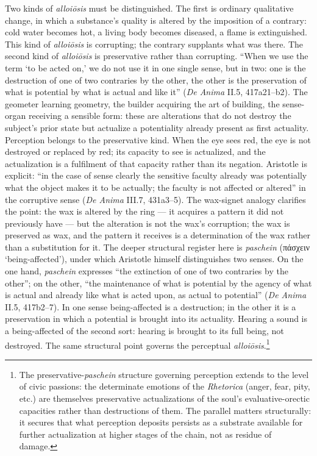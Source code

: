 \documentclass{article}
\newcommand{\gk}[1]{{\greekfont #1}}
\begin{document}
Two kinds of \textit{alloiōsis} must be distinguished. The first is ordinary qualitative change, in which a substance's quality is altered by the imposition of a contrary: cold water becomes hot, a living body becomes diseased, a flame is extinguished. This kind of \textit{alloiōsis} is corrupting; the contrary supplants what was there. The second kind of \textit{alloiōsis} is preservative rather than corrupting. ``When we use the term `to be acted on,' we do not use it in one single sense, but in two: one is the destruction of one of two contraries by the other, the other is the preservation of what is potential by what is actual and like it'' (\textit{De Anima} II.5, 417a21--b2). The geometer learning geometry, the builder acquiring the art of building, the sense-organ receiving a sensible form: these are alterations that do not destroy the subject's prior state but actualize a potentiality already present as first actuality. Perception belongs to the preservative kind. When the eye sees red, the eye is not destroyed or replaced by red; its capacity to see is actualized, and the actualization is a fulfilment of that capacity rather than its negation. Aristotle is explicit: ``in the case of sense clearly the sensitive faculty already was potentially what the object makes it to be actually; the faculty is not affected or altered'' in the corruptive sense (\textit{De Anima} III.7, 431a3--5). The wax-signet analogy clarifies the point: the wax is altered by the ring --- it acquires a pattern it did not previously have --- but the alteration is not the wax's corruption; the wax is preserved as wax, and the pattern it receives is a determination of the wax rather than a substitution for it. The deeper structural register here is \textit{paschein} (\gk{πάσχειν} `being-affected'), under which Aristotle himself distinguishes two senses. On the one hand, \textit{paschein} expresses ``the extinction of one of two contraries by the other''; on the other, ``the maintenance of what is potential by the agency of what is actual and already like what is acted upon, as actual to potential'' (\textit{De Anima} II.5, 417b2--7). In one sense being-affected is a destruction; in the other it is a preservation in which a potential is brought into its actuality. Hearing a sound is a being-affected of the second sort: hearing is brought to its full being, not destroyed. The same structural point governs the perceptual \textit{alloiōsis}.\footnote{The preservative-\textit{paschein} structure governing perception extends to the level of civic passions: the determinate emotions of the \textit{Rhetorica} (anger, fear, pity, etc.) are themselves preservative actualizations of the soul's evaluative-orectic capacities rather than destructions of them. The parallel matters structurally: it secures that what perception deposits persists as a substrate available for further actualization at higher stages of the chain, not as residue of damage.}
\end{document}
